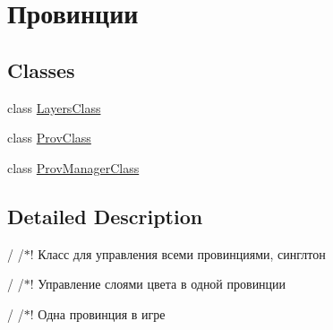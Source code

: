 \hypertarget{group___provs}{}\section{Провинции}
\label{group___provs}
\subsection*{Classes}
\begin{DoxyCompactItemize}
\item 
class \hyperlink{class_layers_class}{Layers\+Class}
\item 
class \hyperlink{class_prov_class}{Prov\+Class}
\item 
class \hyperlink{class_prov_manager_class}{Prov\+Manager\+Class}
\end{DoxyCompactItemize}


\subsection{Detailed Description}
/ /$\ast$! Класс для управления всеми провинциями, синглтон

/ /$\ast$! Управление слоями цвета в одной провинции

/ /$\ast$! Одна провинция в игре 